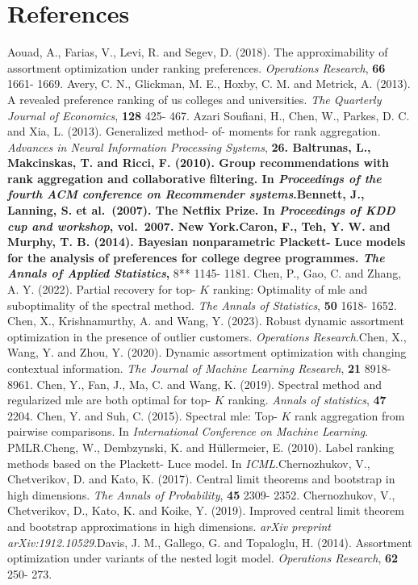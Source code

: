 \section{References}\label{references}

Aouad, A., Farias, V., Levi, R. and Segev, D. (2018). The
approximability of assortment optimization under ranking preferences.
\emph{Operations Research}, \textbf{66} 1661- 1669. Avery, C. N.,
Glickman, M. E., Hoxby, C. M. and Metrick, A. (2013). A revealed
preference ranking of us colleges and universities. \emph{The Quarterly
Journal of Economics}, \textbf{128} 425- 467. Azari Soufiani, H., Chen,
W., Parkes, D. C. and Xia, L. (2013). Generalized method- of- moments
for rank aggregation. \emph{Advances in Neural Information Processing
Systems}, \textbf{26. Baltrunas, L., Makcinskas, T. and Ricci, F.
(2010). Group recommendations with rank aggregation and collaborative
filtering. In \emph{Proceedings of the fourth ACM conference on
Recommender systems}.Bennett, J., Lanning, S. et al.~(2007). The Netflix
Prize. In \emph{Proceedings of KDD cup and workshop}, vol.~2007. New
York.Caron, F., Teh, Y. W. and Murphy, T. B. (2014). Bayesian
nonparametric Plackett- Luce models for the analysis of preferences for
college degree programmes. \emph{The Annals of Applied Statistics},} 8**
1145- 1181. Chen, P., Gao, C. and Zhang, A. Y. (2022). Partial recovery
for top- \(K\) ranking: Optimality of mle and suboptimality of the
spectral method. \emph{The Annals of Statistics}, \textbf{50} 1618-
1652. Chen, X., Krishnamurthy, A. and Wang, Y. (2023). Robust dynamic
assortment optimization in the presence of outlier customers.
\emph{Operations Research}.Chen, X., Wang, Y. and Zhou, Y. (2020).
Dynamic assortment optimization with changing contextual information.
\emph{The Journal of Machine Learning Research}, \textbf{21} 8918- 8961.
Chen, Y., Fan, J., Ma, C. and Wang, K. (2019). Spectral method and
regularized mle are both optimal for top- \(K\) ranking. \emph{Annals of
statistics}, \textbf{47} 2204. Chen, Y. and Suh, C. (2015). Spectral
mle: Top- \(K\) rank aggregation from pairwise comparisons. In
\emph{International Conference on Machine Learning}. PMLR.Cheng, W.,
Dembzynski, K. and Hüllermeier, E. (2010). Label ranking methods based
on the Plackett- Luce model. In \emph{ICML}.Chernozhukov, V.,
Chetverikov, D. and Kato, K. (2017). Central limit theorems and
bootstrap in high dimensions. \emph{The Annals of Probability},
\textbf{45} 2309- 2352. Chernozhukov, V., Chetverikov, D., Kato, K. and
Koike, Y. (2019). Improved central limit theorem and bootstrap
approximations in high dimensions. \emph{arXiv preprint
arXiv:1912.10529}.Davis, J. M., Gallego, G. and Topaloglu, H. (2014).
Assortment optimization under variants of the nested logit model.
\emph{Operations Research}, \textbf{62} 250- 273.

